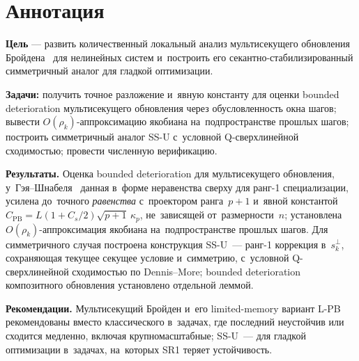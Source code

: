 
\chapter*{Аннотация}

\noindent
\textbf{Цель} --- развить количественный локальный анализ
мультисекущего обновления Бройдена~\cite{schnabel1983} для нелинейных
систем и~построить его секантно-стабилизированный симметричный аналог
для гладкой оптимизации.

\noindent
\textbf{Задачи:} получить точное разложение и~явную константу для оценки
bounded deterioration мультисекущего обновления через обусловленность
окна шагов; вывести $O(\rho_k)$-аппроксимацию якобиана на~подпространстве
прошлых шагов; построить симметричный аналог SS-U с~условной Q-сверхлинейной
сходимостью; провести численную верификацию.

\noindent
\textbf{Результаты.} Оценка bounded deterioration для мультисекущего
обновления, у~Гэя--Шнабеля~\cite{gay_schnabel1978} данная в~форме
неравенства сверху для ранг-1 специализации, усилена до~точного
\emph{равенства} с~проектором ранга~$p{+}1$ и~явной константой
$C_{\mathrm{PB}} = L(1{+}C_s/2)\sqrt{p+1}\,\kappa_p$, не~зависящей
от~размерности~$n$; установлена $O(\rho_k)$-аппроксимация якобиана
на~подпространстве прошлых шагов. Для симметричного случая построена
конструкция SS-U~--- ранг-1 коррекция в~$s_k^{\perp}$, сохраняющая
текущее секущее условие и~симметрию, с~условной Q-сверхлинейной
сходимостью по Dennis--More; bounded deterioration композитного
обновления установлено отдельной леммой.

\noindent
\textbf{Рекомендации.} Мультисекущий Бройден и~его limited-memory
вариант L-PB рекомендованы вместо классического в~задачах, где
последний неустойчив или сходится медленно, включая крупномасштабные;
SS-U~--- для гладкой оптимизации в~задачах, на~которых SR1 теряет
устойчивость.
